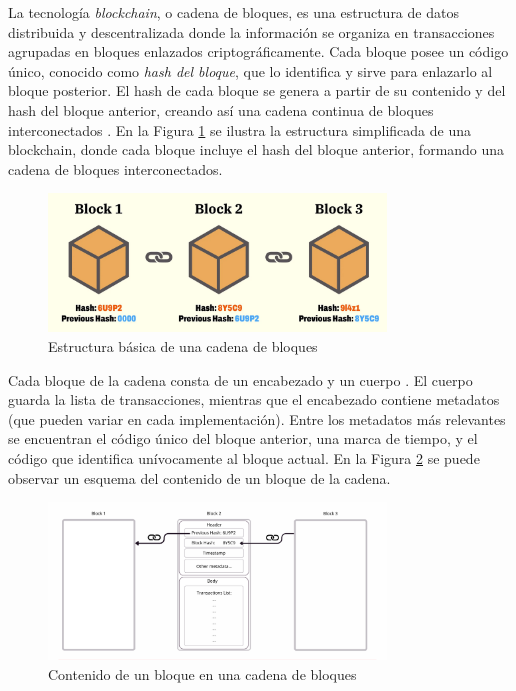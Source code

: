 La tecnología \textit{blockchain}, o cadena de bloques, es una estructura de datos distribuida y descentralizada donde la información se organiza en transacciones agrupadas en bloques enlazados criptográficamente. Cada bloque posee un código único, conocido como \textit{hash del bloque}, que lo identifica y sirve para enlazarlo al bloque posterior. El hash de cada bloque se genera a partir de su contenido y del hash del bloque anterior, creando así una cadena continua de bloques interconectados \cite{tripathi2023comprehensive}. En la Figura \ref{fig:blockchain-basic} se ilustra la estructura simplificada de una blockchain, donde cada bloque incluye el hash del bloque anterior, formando una cadena de bloques interconectados.

\begin{figure}[!tb]
    \centering
    \includegraphics[width=0.8\textwidth]{Figures/blockchain-basic.jpg}
    \caption{Estructura básica de una cadena de bloques}
    \label{fig:blockchain-basic}
\end{figure}

Cada bloque de la cadena consta de un encabezado y un cuerpo \cite{tripathi2023comprehensive}. El cuerpo guarda la lista de transacciones, mientras que el encabezado contiene metadatos (que pueden variar en cada implementación). Entre los metadatos más relevantes se encuentran el código único del bloque anterior, una marca de tiempo, y el código que identifica unívocamente al bloque actual. En la Figura \ref{fig:block-structure} se puede observar un esquema del contenido de un bloque de la cadena.

\begin{figure}[!tb]
    \centering
    \includegraphics[width=0.8\textwidth]{Figures/block-structure.png}
    \caption{Contenido de un bloque en una cadena de bloques}
    \label{fig:block-structure}
\end{figure}

